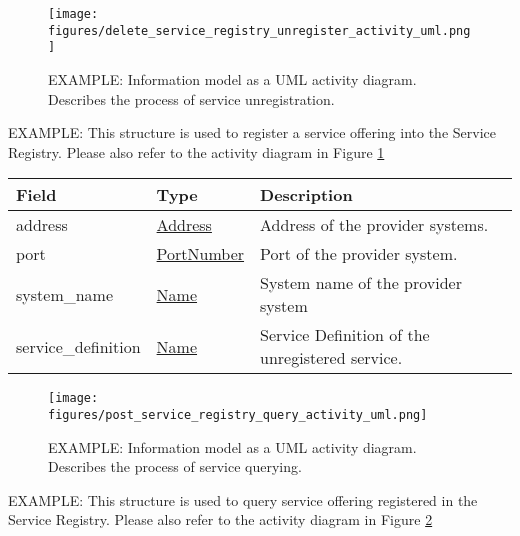 \documentclass[a4paper]{arrowhead}
\newcommand{\pref}[1]{{\textcolor{ArrowheadGrey}{\hyperref[sec:model:primitives:#1]{#1}}}}
\begin{document}
\begin{figure}[ht!]
  \centering
  \texttt{[image: figures/delete\_service\_registry\_unregister\_activity\_uml.png]}
  \caption{\color{red}  EXAMPLE:
    Information model as a UML activity diagram.
    Describes the process of service unregistration.
    \color{black}
  }
  \label{fig:unregister_overview}
\end{figure}

\newpage


\color{red} 
EXAMPLE: This structure is used to register a service offering into
the Service Registry. Please also refer to the activity diagram in
Figure \ref{fig:unregister_overview} \color{black}

\begin{table}[ht!]
\begin{tabularx}{\textwidth}{| p{4.25cm} | p{3.5cm} | X |} \hline
\rowcolor{gray!33} Field & Type      & Description \\ \hline
address                 & \pref{Address} & Address of the provider systems. \\ \hline
port                   & \pref{PortNumber}     & Port of the provider system. \\ \hline
system\_name                  & \pref{Name}     & System name of the provider system \\ \hline
service\_definition                    & \pref{Name} & Service Definition of the unregistered service. \\ \hline
\end{tabularx}
\end{table}

\begin{figure}[ht!]
  \centering
  \texttt{[image: figures/post\_service\_registry\_query\_activity\_uml.png]}
  \caption{\color{red}  EXAMPLE:
    Information model as a UML activity diagram. Describes the process
    of service querying.
    \color{black}
  }
  \label{fig:query_overview}
\end{figure}

\newpage


\color{red} 
EXAMPLE: This structure is used to query service offering registered in
the Service Registry. Please also refer to the activity diagram in
Figure \ref{fig:query_overview} \color{black}
\end{document}
